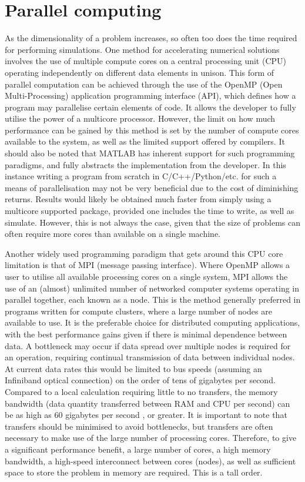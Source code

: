 \section{Parallel computing}

As the dimensionality of a problem increases, so often too does the time required for performing simulations. One method for accelerating numerical solutions involves the use of multiple compute cores on a central processing unit (CPU) operating independently on different data elements in unison. This form of parallel computation can be achieved through the use of the OpenMP (Open Multi-Processing) application programming interface (API), which defines how a program may parallelise certain elements of code. It allows the developer to fully utilise the power of a multicore processor. However, the limit on how much performance can be gained by this method is set by the number of compute cores available to the system, as well as the limited support offered by compilers. It should also be noted that \textsc{MATLAB} has inherent support for such programming paradigms, and fully abstracts the implementation from the developer. In this instance writing a program from scratch in C/C++/Python/etc. for such a means of parallelisation may not be very beneficial due to the cost of diminishing returns. Results would likely be obtained much faster from simply using a multicore supported package, provided one includes the time to write, as well as simulate. However, this is not always the case, given that the size of problems can often require more cores than available on a single machine.

Another widely used programming paradigm that gets around this CPU core limitation is that of MPI (message passing interface). Where OpenMP allows a user to utilise all available processing cores on a single system, MPI allows the use of an (almost) unlimited number of networked computer systems operating in parallel together, each known as a node. This is the method generally preferred in programs written for compute clusters, where a large number of nodes are available to use. It is the preferable choice for distributed computing applications, with the best performance gains given if there is minimal dependence between data. A bottleneck may occur if data spread over multiple nodes is required for an operation, requiring continual transmission of data between individual nodes. At current data rates this would be limited to bus speeds (assuming an Infiniband optical connection) on the order of tens of gigabytes per second. Compared to a local calculation requiring little to no transfers, the memory bandwidth (data quantity transferred between RAM and CPU per second) can be as high as 60 gigabytes per second \cite{DAT:Intel_xeon}, or greater. It is important to note that transfers should be minimised to avoid bottlenecks, but transfers are often necessary to make use of the large number of processing cores. Therefore, to give a significant performance benefit, a large number of cores, a high memory bandwidth, a high-speed interconnect between cores (nodes), as well as sufficient space to store the problem in memory are required. This is a tall order.

